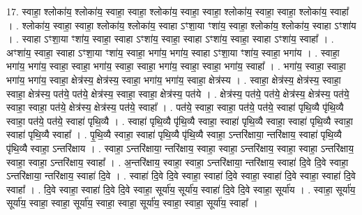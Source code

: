\documentclass[17pt]{extarticle}
\begin{document}
17. स्वाहा॒ श्लोका॑य॒ श्लोका॑य॒ स्वाहा॒ स्वाहा॒ श्लोका॑य॒ स्वाहा॒ स्वाहा॒ श्लोका॑य॒ स्वाहा॒ स्वाहा॒ श्लोका॑य॒ स्वाहा᳚ । . श्लोका॑य॒ स्वाहा॒ स्वाहा॒ श्लोका॑य॒ श्लोका॑य॒ स्वाहा ऽꣳशा॒या ꣳशा॑य॒ स्वाहा॒ श्लोका॑य॒ श्लोका॑य॒ स्वाहा ऽꣳशा॑य । . स्वाहा ऽꣳशा॒या ꣳशा॑य॒ स्वाहा॒ स्वाहा ऽꣳशा॑य॒ स्वाहा॒ स्वाहा ऽꣳशा॑य॒ स्वाहा॒ स्वाहा ऽꣳशा॑य॒ स्वाहा᳚ । . अꣳशा॑य॒ स्वाहा॒ स्वाहा ऽꣳशा॒या ꣳशा॑य॒ स्वाहा॒ भगा॑य॒ भगा॑य॒ स्वाहा ऽꣳशा॒या ꣳशा॑य॒ स्वाहा॒ भगा॑य । . स्वाहा॒ भगा॑य॒ भगा॑य॒ स्वाहा॒ स्वाहा॒ भगा॑य॒ स्वाहा॒ स्वाहा॒ भगा॑य॒ स्वाहा॒ स्वाहा॒ भगा॑य॒ स्वाहा᳚ । . भगा॑य॒ स्वाहा॒ स्वाहा॒ भगा॑य॒ भगा॑य॒ स्वाहा॒ क्षेत्र॑स्य॒ क्षेत्र॑स्य॒ स्वाहा॒ भगा॑य॒ भगा॑य॒ स्वाहा॒ क्षेत्र॑स्य । . स्वाहा॒ क्षेत्र॑स्य॒ क्षेत्र॑स्य॒ स्वाहा॒ स्वाहा॒ क्षेत्र॑स्य॒ पत॑ये॒ पत॑ये॒ क्षेत्र॑स्य॒ स्वाहा॒ स्वाहा॒ क्षेत्र॑स्य॒ पत॑ये । . क्षेत्र॑स्य॒ पत॑ये॒ पत॑ये॒ क्षेत्र॑स्य॒ क्षेत्र॑स्य॒ पत॑ये॒ स्वाहा॒ स्वाहा॒ पत॑ये॒ क्षेत्र॑स्य॒ क्षेत्र॑स्य॒ पत॑ये॒ स्वाहा᳚ । . पत॑ये॒ स्वाहा॒ स्वाहा॒ पत॑ये॒ पत॑ये॒ स्वाहा॑ पृथि॒व्यै पृ॑थि॒व्यै स्वाहा॒ पत॑ये॒ पत॑ये॒ स्वाहा॑ पृथि॒व्यै । . स्वाहा॑ पृथि॒व्यै पृ॑थि॒व्यै स्वाहा॒ स्वाहा॑ पृथि॒व्यै स्वाहा॒ स्वाहा॑ पृथि॒व्यै स्वाहा॒ स्वाहा॑ पृथि॒व्यै स्वाहा᳚ । . पृ॒थि॒व्यै स्वाहा॒ स्वाहा॑ पृथि॒व्यै पृ॑थि॒व्यै स्वाहा॒ ऽन्तरि॑क्षाया॒ न्तरि॑क्षाय॒ स्वाहा॑ पृथि॒व्यै पृ॑थि॒व्यै स्वाहा॒ ऽन्तरि॑क्षाय । . स्वाहा॒ ऽन्तरि॑क्षाया॒ न्तरि॑क्षाय॒ स्वाहा॒ स्वाहा॒ ऽन्तरि॑क्षाय॒ स्वाहा॒ स्वाहा॒ ऽन्तरि॑क्षाय॒ स्वाहा॒ स्वाहा॒ ऽन्तरि॑क्षाय॒ स्वाहा᳚ । . अ॒न्तरि॑क्षाय॒ स्वाहा॒ स्वाहा॒ ऽन्तरि॑क्षाया॒ न्तरि॑क्षाय॒ स्वाहा॑ दि॒वे दि॒वे स्वाहा॒ ऽन्तरि॑क्षाया॒ न्तरि॑क्षाय॒ स्वाहा॑ दि॒वे । . स्वाहा॑ दि॒वे दि॒वे स्वाहा॒ स्वाहा॑ दि॒वे स्वाहा॒ स्वाहा॑ दि॒वे स्वाहा॒ स्वाहा॑ दि॒वे स्वाहा᳚ । . दि॒वे स्वाहा॒ स्वाहा॑ दि॒वे दि॒वे स्वाहा॒ सूर्या॑य॒ सूर्या॑य॒ स्वाहा॑ दि॒वे दि॒वे स्वाहा॒ सूर्या॑य । . स्वाहा॒ सूर्या॑य॒ सूर्या॑य॒ स्वाहा॒ स्वाहा॒ सूर्या॑य॒ स्वाहा॒ स्वाहा॒ सूर्या॑य॒ स्वाहा॒ स्वाहा॒ सूर्या॑य॒ स्वाहा᳚ । \newline
\end{document}
